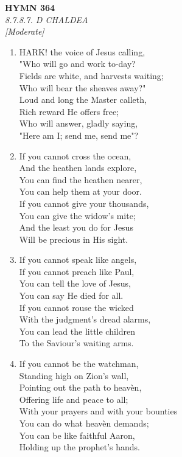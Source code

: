 \newpage
\begin{center}
    {\Large \textbf{HYMN 364}}
    \\
    \textit{8.7.8.7. D CHALDEA}
    \\
    \textit{\small [Moderate]}
\end{center}
\vspace{1em}

\begin{enumerate}
    \item HARK! the voice of Jesus calling, \\
        "Who will go and work to-day? \\
        Fields are white, and harvests waiting; \\
        Who will bear the sheaves away?" \\
        Loud and long the Master calleth, \\
        Rich reward He offers free; \\
        Who will answer, gladly saying, \\
        "Here am I; send me, send me"?

    \item If you cannot cross the ocean, \\
        And the heathen lands explore, \\
        You can find the heathen nearer, \\
        You can help them at your door. \\
        If you cannot give your thousands, \\
        You can give the widow's mite; \\
        And the least you do for Jesus \\
        Will be precious in His sight.

    \item If you cannot speak like angels, \\
        If you cannot preach like Paul, \\
        You can tell the love of Jesus, \\
        You can say He died for all. \\
        If you cannot rouse the wicked \\
        With the judgment's dread alarms, \\
        You can lead the little children \\
        To the Saviour's waiting arms.

    \item If you cannot be the watchman, \\
        Standing high on Zion's wall, \\
        Pointing out the path to heav\`en, \\
        Offering life and peace to all; \\
        With your prayers and with your bounties \\
        You can do what heav\`en demands; \\
        You can be like faithful Aaron, \\
        Holding up the prophet's hands.


\end{enumerate}
